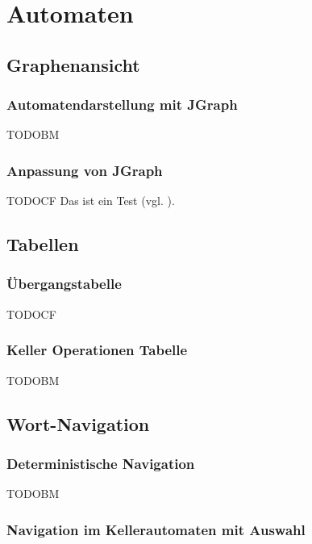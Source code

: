 

\chapter{Automaten}\label{Machines}


\section{Graphenansicht}


\subsection{Automatendarstellung mit JGraph}

TODOBM


\subsection{Anpassung von JGraph}

TODOCF Das ist ein Test (vgl. \cite{Sieber0}).


\section{Tabellen}


\subsection{Übergangstabelle}

TODOCF


\subsection{Keller Operationen Tabelle}

TODOBM


\section{Wort-Navigation}


\subsection{Deterministische Navigation}

TODOBM


\subsection{Navigation im Kellerautomaten mit Auswahl}

